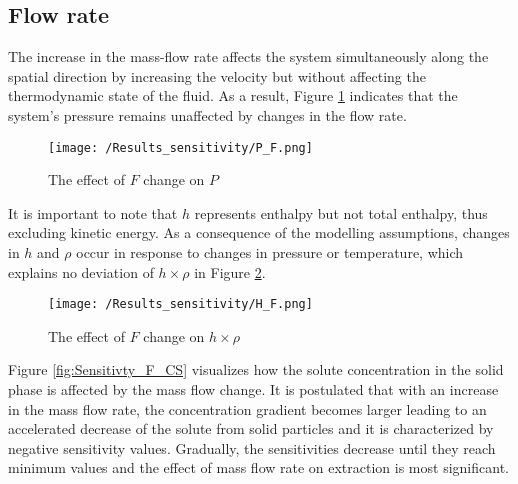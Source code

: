 \documentclass[../Article_Sensitivity_Analsysis.tex]{subfiles}
\begin{document}
	
	\subsection{Flow rate}
	
	The increase in the mass-flow rate affects the system simultaneously along the spatial direction by increasing the velocity but without affecting the thermodynamic state of the fluid. As a result, Figure \ref{fig:Sensitivty_F_P} indicates that the system's pressure remains unaffected by changes in the flow rate.
	
	\begin{figure}[h!]
		\centering
		\texttt{[image: /Results\_sensitivity/P\_F.png]}
		\caption{The effect of $F$ change on $P$}
		\label{fig:Sensitivty_F_P}
	\end{figure}
	
	It is important to note that $h$ represents enthalpy but not total enthalpy, thus excluding kinetic energy. As a consequence of the modelling assumptions, changes in $h$ and $\rho$ occur in response to changes in pressure or temperature, which explains no deviation of $h \times \rho$ in Figure \ref{fig:Sensitivty_F_H}.
	
	
	\begin{figure}[h!]
		\centering
		\texttt{[image: /Results\_sensitivity/H\_F.png]}
		\caption{The effect of $F$ change on $h \times \rho$}
		\label{fig:Sensitivty_F_H}
	\end{figure}
	
	Figure \ref{fig:Sensitivty_F_CS} visualizes how the solute concentration in the solid phase is affected by the mass flow change. It is postulated that with an increase in the mass flow rate, the concentration gradient becomes larger leading to an accelerated decrease of the solute from solid particles and it is characterized by negative sensitivity values. Gradually, the sensitivities decrease until they reach minimum values and the effect of mass flow rate on extraction is most significant.
	
\end{document}
